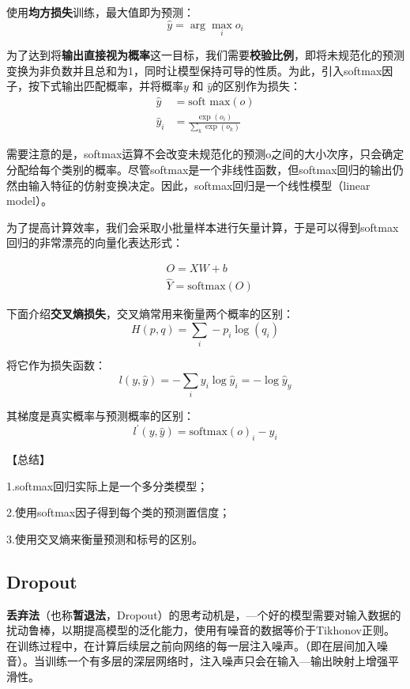 使用\textbf{均方损失}训练，最大值即为预测：
\begin{equation}\hat{y}=\arg\max_io_i\end{equation}

为了达到将\textbf{输出直接视为概率}这一目标，我们需要\textbf{校验比例}，即将未规范化的预测变换为非负数并且总和为1，同时让模型保持可导的性质。为此，引入softmax因子，按下式输出匹配概率，并将概率$y\text{ 和 }\hat{y}$的区别作为损失：
\begin{equation}\begin{align}
		\hat{y} &= \text{soft max}(o) \\
		\hat{y}_i &= \frac{\exp(o_i)}{\sum_k \exp(o_k)}
\end{align}\end{equation}

需要注意的是，softmax运算不会改变未规范化的预测o之间的大小次序，只会确定分配给每个类别的概率。尽管softmax是一个非线性函数，但softmax回归的输出仍然由输入特征的仿射变换决定。因此，softmax回归是一个线性模型（linear model）。

为了提高计算效率，我们会采取小批量样本进行矢量计算，于是可以得到softmax回归的非常漂亮的向量化表达形式：

\begin{equation}\begin{aligned}&O=XW+b\\&\hat{Y}=\mathrm{softmax}(O)\end{aligned}\end{equation}

下面介绍\textbf{交叉熵损失}，交叉熵常用来衡量两个概率的区别：
\begin{equation}H(p,q)=\sum_i-p_i\log(q_i)\end{equation}

将它作为损失函数：
\begin{equation}l(y,\hat{y})=-\sum_iy_i\log\hat{y}_i=-\log\hat{y}_y\end{equation}

其梯度是真实概率与预测概率的区别：
\begin{equation}l^{\prime}(y,\hat{y})=\mathrm{softmax}(o)_i-y_i\end{equation}

【总结】

1.softmax回归实际上是一个多分类模型；

2.使用softmax因子得到每个类的预测置信度；

3.使用交叉熵来衡量预测和标号的区别。

\subsection{Dropout}
\textbf{丢弃法}（也称\textbf{暂退法}，Dropout）的思考动机是，—个好的模型需要对输入数据的扰动鲁棒，以期提高模型的泛化能力，使用有噪音的数据等价于Tikhonov正则。在训练过程中，在计算后续层之前向网络的每一层注入噪声。（即在层间加入噪音）。当训练一个有多层的深层网络时，注入噪声只会在输入—输出映射上增强平滑性。

